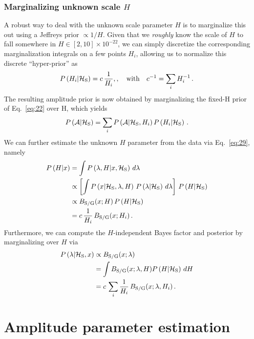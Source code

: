 \documentclass[aps,prd,onecolumn,notitlepage,nofootinbib,superscriptaddress,altaffilletter,floatfix]{revtex4-1}
\begin{document}
\subsubsection{Marginalizing unknown scale $H$}
\label{sec:marg-unkn-scale}

A robust way to deal with the unknown scale parameter $H$ is to marginalize this out using a Jeffreys prior $\propto 1/H$. Given that we
\emph{roughly} know the scale of $H$ to fall somewhere in $H\in{[2,10]}\times10^{-22}$, we can simply discretize the corresponding marginalization
integrals on a few points ${H_i}$, allowing us to normalize this discrete ``hyper-prior'' as
\begin{equation}
  \label{eq:44}
  P\left(H_i\middle|\mathcal{H}_{\mathrm{S}}\right) = c\,\frac{1}{H_i},,\quad\text{with}\quad c^{-1} = \sum_i H_i^{-1}\,.
\end{equation}
The resulting amplitude prior is now obtained by marginalizing the fixed-H prior of Eq.~\eqref{eq:22} over H, which yields
\begin{equation}
  \label{eq:52}
  P\left({\mathcal A}\middle|\mathcal{H}_{\mathrm{S}}\right) = \sum_i P\left({\mathcal A}\middle|\mathcal{H}_{\mathrm{S}},H_i\right) P\left(H_i\middle|\mathcal{H}_{\mathrm{S}}\right)\,.
\end{equation}
We can further estimate the unknown $H$ parameter from the data via Eq.~\eqref{eq:29}, namely
\begin{align}
  \label{eq:45}
  P\left(H\middle|x\right) &= \int P\left(\lambda,H\middle|x,\mathcal{H}_{\mathrm{S}}\right)\,d\lambda\\
  &\propto \left[\int P\left(x\middle|\mathcal{H}_{\mathrm{S}},\lambda,H\right)\,P\left(\lambda\middle|\mathcal{H}_{\mathrm{S}}\right)\,d\lambda\right]\,P\left(H\middle|\mathcal{H}_{\mathrm{S}}\right)\\
  &\propto B_{\mathrm{S/G}}(x;H)\,P\left(H\middle|\mathcal{H}_{\mathrm{S}}\right) \\
  &= c\,\frac{1}{H_i}\,B_{\mathrm{S/G}}(x;H_i)\,.
\end{align}
Furthermore, we can compute the $H$-independent Bayes factor and posterior by marginalizing over $H$ via
\begin{align}
  \label{eq:46}
  P\left(\lambda\middle|\mathcal{H}_{\mathrm{S}},x\right) &\propto B_{\mathrm{S/G}}(x;\lambda)\\
  &=\int B_{\mathrm{S/G}}(x;\lambda,H)P\left(H\middle|\mathcal{H}_{\mathrm{S}}\right)\,dH\\
  &= c\,\sum_i \frac{1}{H_i} \, B_{\mathrm{S/G}}(x;\lambda,H_i)\,.
\end{align}

\section{Amplitude parameter estimation}
\label{sec:parameter-estimation}
\end{document}
